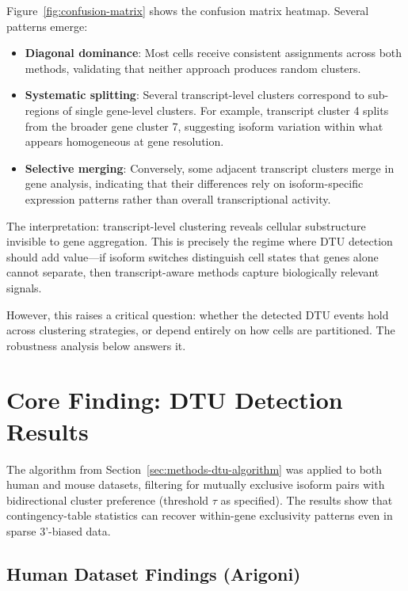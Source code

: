Figure~\ref{fig:confusion-matrix} shows the confusion matrix heatmap. Several patterns emerge:
\begin{itemize}
    \item \textbf{Diagonal dominance}: Most cells receive consistent assignments across both methods, validating that neither approach produces random clusters.
    
    \item \textbf{Systematic splitting}: Several transcript-level clusters correspond to sub-regions of single gene-level clusters. For example, transcript cluster 4 splits from the broader gene cluster 7, suggesting isoform variation within what appears homogeneous at gene resolution.
    
    \item \textbf{Selective merging}: Conversely, some adjacent transcript clusters merge in gene analysis, indicating that their differences rely on isoform-specific expression patterns rather than overall transcriptional activity.
\end{itemize}

The interpretation: transcript-level clustering reveals cellular substructure invisible to gene aggregation. This is precisely the regime where DTU detection should add value---if isoform switches distinguish cell states that genes alone cannot separate, then transcript-aware methods capture biologically relevant signals.

However, this raises a critical question: whether the detected DTU events hold across clustering strategies, or depend entirely on how cells are partitioned. The robustness analysis below answers it.

\section{Core Finding: DTU Detection Results}\label{sec:dtu-results}
The algorithm from Section~\ref{sec:methods-dtu-algorithm} was applied to both human and mouse datasets, filtering for mutually exclusive isoform pairs with bidirectional cluster preference (threshold $\tau$ as specified). The results show that contingency-table statistics can recover within-gene exclusivity patterns even in sparse 3'-biased data.

\subsection*{Human Dataset Findings (Arigoni)}\label{sec:results-human}

